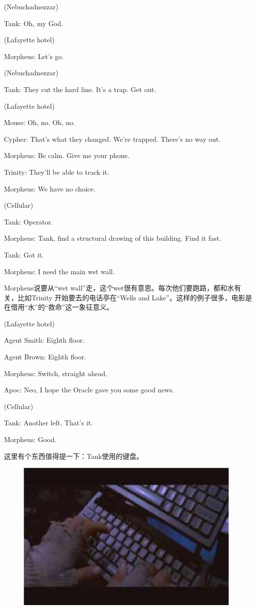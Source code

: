 \documentclass{ctexart}
\newenvironment{myquote}{\color{green} \setlength{\leftskip}{6em} \setlength{\rightskip}{4em} \setlength{\parindent}{-2em}}{\par}
\begin{document}
\begin{myquote}
(Nebuchadnezzar)

Tank: Oh, my God.

(Lafayette hotel)

Morpheus: Let's go.

(Nebuchadnezzar)

Tank: They cut the hard line. It's a trap. Get out.

(Lafayette hotel)

Mouse: Oh, no. Oh, no.

Cypher: That's what they changed. We're trapped. There's no way out.

Morpheus: Be calm. Give me your phone.

Trinity: They'll be able to track it.

Morpheus: We have no choice.

(Cellular)

Tank: Operator.

Morpheus: Tank, find a structural drawing of this building. Find it fast.

Tank: Got it.

Morpheus: I need the main wet wall.
\end{myquote}

Morpheus说要从“wet wall”走，这个wet很有意思。每次他们要跑路，都和水有关，比如Trinity 开始要去的电话亭在“Wells and Lake”。这样的例子很多，电影是在借用“水”的“救命”这一象征意义。

\begin{myquote}
(Lafayette hotel)

Agent Smith: Eighth floor.

Agent Brown: Eighth floor.

Morpheus: Switch, straight ahead.

Apoc: Neo, I hope the Oracle gave you some good news.

(Cellular)

Tank: Another left. That's it.

Morpheus: Good.
\end{myquote}

这里有个东西值得提一下：Tank使用的键盘。

\begin{figure}[htb]
\centering
\includegraphics[width=0.5\linewidth]{fig/read_Matrix-55}
\end{figure}
\end{document}
